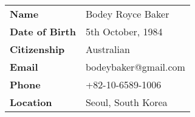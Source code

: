 \documentclass[10pt, a4paper]{report}
\begin{document}
\begin{minipage}{0.2\linewidth}
\begin{tabular}{ll}
{\bf Name} & Bodey Royce Baker \\ 
{\bf Date of Birth} & 5th October, 1984 \\
{\bf Citizenship} & Australian \\
{\bf Email} & bodeybaker@gmail.com \\
{\bf Phone} & {\footnotesize +}82-10-6589-1006 \\
{\bf Location} & Seoul, South Korea \\

\end{tabular}
\end{minipage}
\hfill
\begin{minipage}{0.5\linewidth}
{%


\vspace{0.7em}


}%
\end{minipage}

\vfill
\end{document}
